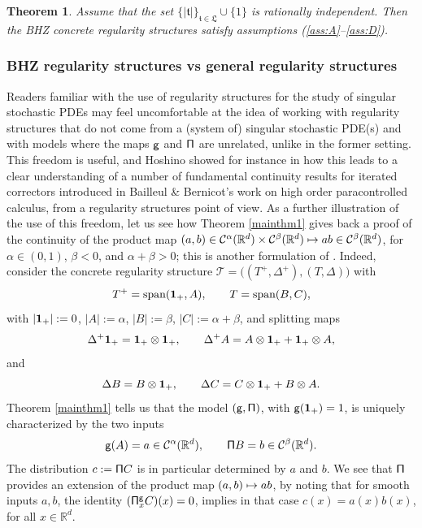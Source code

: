 \documentclass[JEP,XML,SOM,Unicode,published]{cedram}
\newcommand\mto{\mathchoice{\longmapsto}{\mapsto}{\mapsto}{\mapsto}}
\theoremstyle{plain}
\newtheorem{thm}{Theorem}
\theoremstyle{definition}
\newcommand{\bbR}{\mathbb{R}}
\newcommand{\mcC}{\mathcal{C}}
\begin{document}
\begin{thm} \label{mainthm3}
Assume that the set $\{|\mathfrak{t}|\}_{\mathfrak{t}\in\mathfrak{L}}\cup\{1\}$ is rationally independent. Then the \emph{BHZ} concrete regularity structures satisfy assumptions \textup{(\ref{ass:A}--\ref{ass:D})}.
\end{thm}

\subsubsection*{BHZ regularity structures vs general regularity structures}
Readers familiar with the use of regularity structures for the study of singular stochastic PDEs may feel uncomfortable at the idea of working with regularity structures that do not come from a (system of) singular stochastic PDE(s) and with models where the maps $\sf g$ and $\sf\Pi$ are unrelated, unlike in the former setting. This freedom is useful, and Hoshino showed for instance in \cite{HoshinoCommutator1, HoshinoCommutator2} how this leads to a clear understanding of a number of fundamental continuity results for iterated correctors introduced in Bailleul \& Bernicot's work \cite{BB16} on high order paracontrolled calculus, from a regularity structures point of view. As a further illustration of the use of this freedom, let us see how Theorem \ref{mainthm1} gives back a proof of the continuity of the product map $(a,b)\in \mcC^\alpha(\bbR^d)\times \mcC^\beta(\bbR^d) \mto ab\in \mcC^\beta(\bbR^d)$, for $\alpha\in(0,1)$, $\beta<0$, and $\alpha+\beta>0$; this is another formulation of \cite[Prop.\,4.14]{Hai}.
Indeed, consider the concrete regularity structure $\mathscr{T}=\bigl((T^+,\Delta^+), (T,\Delta)\bigr)$ with
\[
T^+ = \textrm{span}({\bf 1}_+, A), \qquad T = \textrm{span}(B,C),
\]
with $\vert{\bf1}_+\vert:=0$, $\vert A\vert:=\alpha$, $\vert B\vert:=\beta$, $\vert C\vert:=\alpha+\beta$, and splitting maps
\[
\Delta^+{\bf 1}_+ = {\bf 1}_+\otimes {\bf 1}_+, \qquad \Delta^+A = A\otimes{\bf 1}_+ + {\bf 1}_+\otimes A,
\]
and
\[
\Delta B = B\otimes {\bf 1}_+, \qquad \Delta C = C\otimes{\bf 1}_+ + B\otimes A.
\]
Theorem \ref{mainthm1} tells us that the model $\sf (g,\Pi)$, with ${\sf g}({\bf 1}_+)=1$, is uniquely characterized by the two inputs
\[
{\sf g}(A) = a\in \mcC^\alpha(\bbR^d), \qquad {\sf \Pi}B = b\in \mcC^\beta(\bbR^d).
\]
The distribution $c:={\sf \Pi}C$ is in particular determined by $a$ and $b$. We see that $\sf \Pi$ provides an extension of the product map $(a,b)\mto ab$, by noting that for smooth inputs $a,b$, the identity $({\sf \Pi}_x^{\sf g}C)(x)=0$, implies in that case $c(x)=a(x)b(x)$, for all $x\in\bbR^d$.
\end{document}

